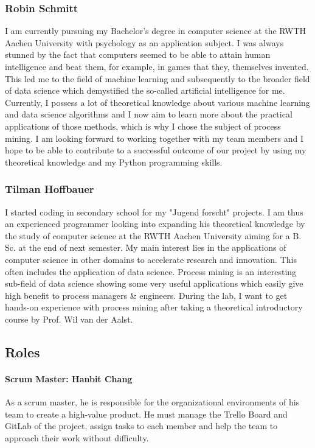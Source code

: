 \documentclass{article}
\begin{document}
\subsubsection{Robin Schmitt}
I am currently pursuing my Bachelor's degree in computer science at the RWTH Aachen University with psychology as an application subject. I was always stunned by the fact that computers seemed to be able to attain human intelligence and beat them, for example, in games that they, themselves invented. This led me to the field of machine learning and subsequently to the broader field of data science which demystified the so-called artificial intelligence for me. Currently, I possess a lot of theoretical knowledge about various machine learning and data science algorithms and I now aim to learn more about the practical applications of those methods, which is why I chose the subject of process mining. I am looking forward to working together with my team members and I hope to be able to contribute to a successful outcome of our project by using my theoretical knowledge and my Python programming skills.

\subsubsection{Tilman Hoffbauer}
I started coding in secondary school for my "Jugend forscht" projects. I am thus an experienced programmer looking into expanding his theoretical knowledge by the study of computer science at the RWTH Aachen University aiming for a B. Sc. at the end of next semester. My main interest lies in the applications of computer science in other domains to accelerate research and innovation. This often includes the application of data science. Process mining is an interesting sub-field of data science showing some very useful applications which easily give high benefit to process managers \& engineers. During the lab, I want to get hands-on experience with process mining after taking a theoretical introductory course by Prof. Wil van der Aalst.

\subsection{Roles}
\paragraph{Scrum Master: Hanbit Chang}
As a scrum master, he is responsible for the organizational environments of his team to create a high-value product. He must manage the Trello Board and GitLab of the project, assign tasks to each member and help the team to approach their work without difficulty.
\end{document}
